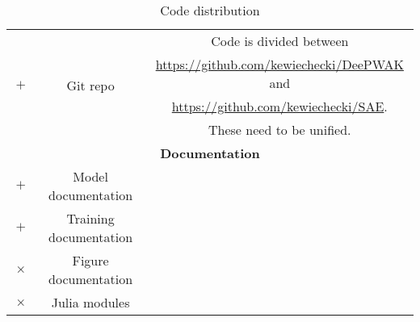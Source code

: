 \begin{table}[]
    \centering
    \begin{tabular}{cc|c}
    \hline
\multirow{4}{*}{$\boxed{+}$} & \multirow{4}{*}{Git repo} & Code is divided between \\
& & \url{https://github.com/kewiechecki/DeePWAK} and \\
& & \url{https://github.com/kewiechecki/SAE}. \\
& & These need to be unified. \\
\hline
\multicolumn{3}{c}{\textbf{Documentation}} \\
\hline
$\boxed{+}$ & Model documentation & \\
$\boxed{+}$ & Training documentation & \\
$\boxed{\times}$ & Figure documentation & \\
$\boxed{\times}$ & Julia modules & \\
\hline

    \end{tabular}
    \caption{Code distribution}
    \label{tab:docs}
\end{table}